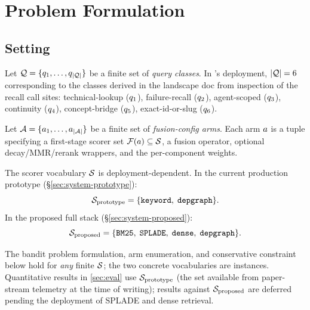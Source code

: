 \section{Problem Formulation}
\label{sec:problem}


\subsection{Setting}

Let $\mathcal{Q} = \{q_1, \ldots, q_{|\mathcal{Q}|}\}$
be a finite set of \emph{query classes}. In \blackrim's deployment,
$|\mathcal{Q}| = 6$ corresponding to the classes derived in the landscape
doc \cite{blackrim_ijl0_landscape} from inspection of the recall call
sites: technical-lookup ($q_1$), failure-recall ($q_2$),
agent-scoped ($q_3$), continuity ($q_4$),
concept-bridge ($q_5$), exact-id-or-slug ($q_6$).

Let $\mathcal{A} = \{a_1, \ldots, a_{|\mathcal{A}|}\}$ be a finite set of
\emph{fusion-config arms}. Each arm $a$ is a tuple specifying a
first-stage scorer set $\mathcal{F}(a) \subseteq \mathcal{S}$, a fusion
operator, optional decay/MMR/rerank wrappers, and the per-component
weights.

The scorer vocabulary $\mathcal{S}$ is deployment-dependent.  In the
current production prototype (\S\ref{sec:system-prototype}):
\[
  \mathcal{S}_{\text{prototype}} = \{\texttt{keyword},\; \texttt{depgraph}\}.
\]
In the proposed full stack (\S\ref{sec:system-proposed}):
\[
  \mathcal{S}_{\text{proposed}} = \{\texttt{BM25},\; \texttt{SPLADE},\;
                                  \texttt{dense},\; \texttt{depgraph}\}.
\]

The bandit problem formulation, arm enumeration, and conservative
constraint below hold for \emph{any} finite $\mathcal{S}$; the two
concrete vocabularies are instances.  Quantitative results in
\cref{sec:eval} use $\mathcal{S}_{\text{prototype}}$ (the set available
from paper-stream telemetry at the time of writing); results against
$\mathcal{S}_{\text{proposed}}$ are deferred pending the deployment of
SPLADE and dense retrieval.


